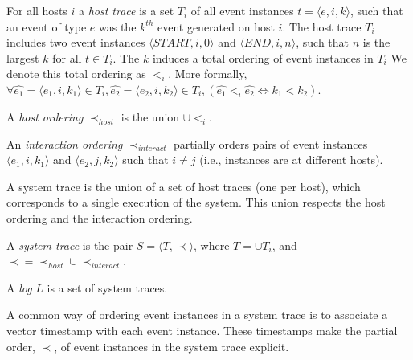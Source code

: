 \begin{definition} \label{def:host_trace} For all hosts
    $i$ a \textit{host trace} is a set $T_i$ of all event instances $t
    = \langle e,i,k \rangle$, such that an event of type $e$ was the
    $k^{th}$ event generated on host $i$.  The host trace $T_i$
    includes two event instances $\langle START,i,0 \rangle$ and
    $\langle END,i,n \rangle$, such that $n$ is the largest $k$ for
    all $t \in T_i$. The $k$ induces a total ordering of event
    instances in $T_i$ We denote this total ordering as $<_i$. More
    formally, $\forall \hat{e_1} = \langle e_1, i, k_1 \rangle \in
    T_i, \hat{e_2} = \langle e_2,i,k_2 \rangle\in T_i, (\hat{e_1} <_i
\hat{e_2} \iff k_1 <k_2)$.  \end{definition}


\begin{definition} \label{def:host_ordering} A
\textit{host ordering} $\prec_{host}$ is the union $\cup<_i$.
\end{definition}

\begin{definition}
    \label{def:interaction_ordering} An \textit{interaction ordering}
    $\prec_{interact}$ partially orders pairs of event instances
    $\langle e_1, i , k_1 \rangle$ and $\langle e_2,j,k_2 \rangle$
    such that $i \neq j$ (i.e., instances are at different hosts).
\end{definition}

A system trace is the union of a set of host traces (one per host),
which corresponds to a single execution of the system. This union
respects the host ordering and the interaction ordering.

\begin{definition} \label{def:system_trace} A
\textit{system trace} is the pair $S = \langle T,\prec \rangle$, where
$T = \cup T_i$, and $\prec = \prec_{host} \cup \prec_{interact}$.
\end{definition}

\begin{definition}[Log] \label{def:log} A \textit{log} $L$ is a set of
system traces.  \end{definition}

A common way of ordering event instances in a system trace is to
associate a vector timestamp with each event instance. These
timestamps make the partial order, $\prec$, of event instances in the
system trace explicit.

